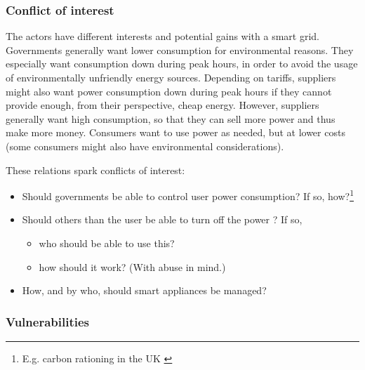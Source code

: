 \subsubsection{Conflict of interest}
The actors have different interests and potential gains with a smart grid.
Governments generally want lower consumption for environmental reasons.
They especially want consumption down during peak hours, in order to avoid the usage of environmentally unfriendly energy sources.
Depending on tariffs, suppliers might also want power consumption down during peak hours if they cannot provide enough, from their perspective, cheap energy.
However, suppliers generally want high consumption, so that they can sell more power and thus make more money.
Consumers want to use power as needed, but at lower costs (some consumers might also have environmental considerations).

These relations spark conflicts of interest:
\begin{itemize}
	\item Should governments be able to control user power consumption? If so, how?\footnote{E.g. carbon rationing in the UK \cite[]{security_economics}}
	\item Should others than the user be able to turn off the power \cite[]{offswitch}? If so,
	\begin{itemize}
		\item who should be able to use this?
		\item how should it work? (With abuse in mind.)
	\end{itemize}
	\item How, and by who, should smart appliances be managed?
\end{itemize}

\subsubsection{Vulnerabilities}
